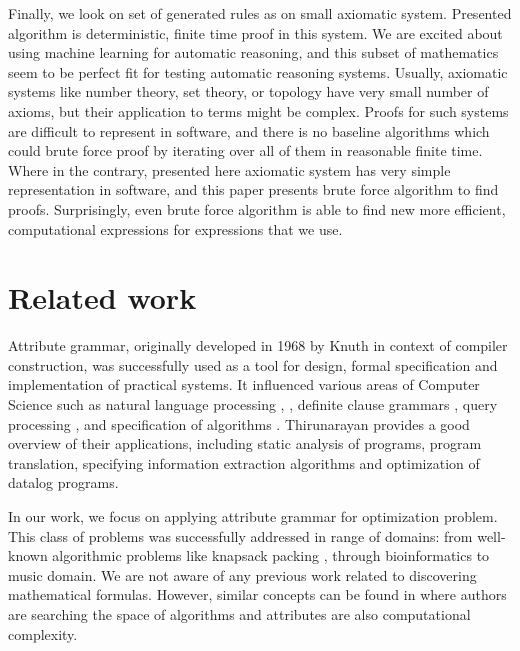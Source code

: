 \documentclass{article}
\begin{document}
Finally, we look on set of generated rules as on small axiomatic system.
Presented algorithm is deterministic, finite time proof in this system.
We are excited about using machine learning for automatic reasoning, and
this subset of mathematics seem to be perfect fit for testing automatic reasoning systems.
Usually, axiomatic systems like number theory, set theory, or topology have very small
number of axioms, but their application to terms might be complex. Proofs
for such systems are difficult to represent in software, and there is no
baseline algorithms which could brute force proof by iterating over all of them in reasonable finite time.
Where in the contrary, presented here axiomatic system has very simple representation
in software, and this paper presents brute force algorithm to find proofs. 
Surprisingly, even brute force algorithm is able to find new more efficient,
computational expressions for expressions that we use.


\section{Related work} \label{relatedwork}


Attribute grammar, originally developed in 1968 by Knuth \cite{knuth1968semantics} in context of compiler
construction, was successfully used as a tool for design, formal specification
and implementation of practical systems. It influenced various areas of
Computer Science such as natural language processing \cite{hafiz2011modular}, \cite{starkie2002inferring}, 
definite clause grammars \cite{bratko2001prolog}, query processing \cite{koch2007attribute}, \cite{ramakrishnan1991top} and specification of algorithms \cite{bellanova1984examples}.
Thirunarayan \cite{thirunarayan2009attribute} provides a good overview of their
applications, including static analysis of programs, program translation, specifying information
extraction algorithms and optimization of datalog programs.

In our work, we focus on applying attribute grammar for optimization problem. This class
of problems was successfully addressed in range of domains: from well-known algorithmic problems 
like knapsack packing \cite{o2004solving}, through bioinformatics \cite{waldispuhl2002approximate} to music domain\cite{desainte1994using}.
We are not aware of any previous work related to discovering mathematical formulas. However,
similar concepts can be found in \cite{cheung1999attribute} where authors are searching
the space of algorithms and attributes are also computational complexity.
\end{document}
